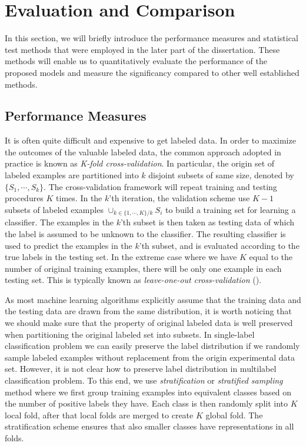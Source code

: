 {




%
%
%
\section{Evaluation and Comparison}

In this section, we will briefly introduce the performance measures and statistical test methods that were employed in the later part of the dissertation.
These methods will enable us to quantitatively evaluate the performance of the proposed models and measure the significancy compared to other well established methods.

%
%
\subsection{Performance Measures}

It is often quite difficult and expensive to get labeled data. 
In order to maximize the outcomes of the valuable labeled data, the common approach adopted in practice is known as \textit{K-fold cross-validation}.
In particular, the origin set of labeled examples are partitioned into $k$ disjoint subsets of same size, denoted by $\{S_1,\cdots,S_k\}$.
The cross-validation framework will repeat training and testing procedures $K$ times.
In the $k$'th iteration, the validation scheme use $K-1$ subsets of labeled examples $\cup_{k\in\{1,\cdots,K\}/k}S_i$ to build a training set for learning a classifier.
The examples in the $k$'th subset is then taken as testing data of which the label is assumed to be unknown to the classifier.
The resulting classifier is used to predict the examples in the $k$'th subset, and is evaluated according to the true labels in the testing set.
In the extreme case where we have $K$ equal to the number of original training examples, there will be only one example in each testing set.
This is typically known as \textit{leave-one-out cross-validation} (\loo).

As most machine learning algorithms explicitly assume that the training data and the testing data are drawn from the same distribution,
it is worth noticing that we should make sure that the property of original labeled data is well preserved when partitioning the original labeled set into subsets.
In single-label classification problem we can easily preserve the label distribution if we randomly sample labeled examples without replacement from the origin experimental data set.
However, it is not clear how to preserve label distribution in multilabel classification problem.
To this end, we use \textit{stratification} or \textit{stratified sampling} method where we first group training examples into equivalent classes based on the number of positive labels they have. 
Each class is then randomly split into $K$ local fold, after that local folds are merged to create $K$ global fold.
The stratification scheme ensures that also smaller classes have representations in all folds. 

}
